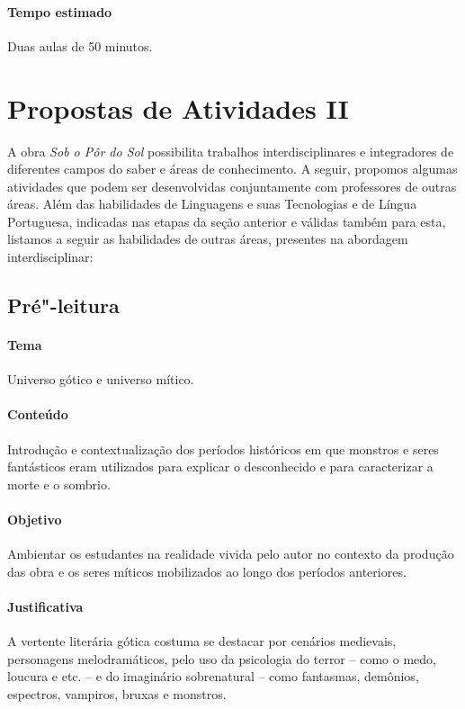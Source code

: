 \documentclass[12pt]{extarticle}
\begin{document}
\paragraph{Tempo estimado} Duas aulas de 50 minutos. 


\section{Propostas de Atividades II}

A obra \emph{Sob o Pôr do Sol} possibilita trabalhos interdisciplinares
e integradores de diferentes campos do saber e áreas de conhecimento. A
seguir, propomos algumas atividades que podem ser desenvolvidas
conjuntamente com professores de outras áreas. Além das habilidades de
Linguagens e suas Tecnologias e de Língua Portuguesa, indicadas nas
etapas da seção anterior e válidas também para esta, listamos a seguir
as habilidades de outras áreas, presentes na abordagem interdisciplinar:


\subsection{Pré"-leitura} 

\paragraph{Tema} Universo gótico e universo mítico.


\paragraph{Conteúdo} Introdução e contextualização dos períodos históricos
em que monstros e seres fantásticos eram utilizados para explicar o desconhecido e 
para caracterizar a morte e o sombrio. 

\paragraph{Objetivo} Ambientar os estudantes na realidade vivida pelo autor no contexto 
da produção das obra e os seres míticos mobilizados ao longo dos períodos anteriores. 

\paragraph{Justificativa} A vertente literária gótica costuma se destacar por cenários medievais,
personagens melodramáticos, pelo uso da psicologia do terror -- como o medo,
loucura e etc. -- e do imaginário sobrenatural -- como fantasmas,
demônios, espectros, vampiros, bruxas e monstros.
\end{document}
